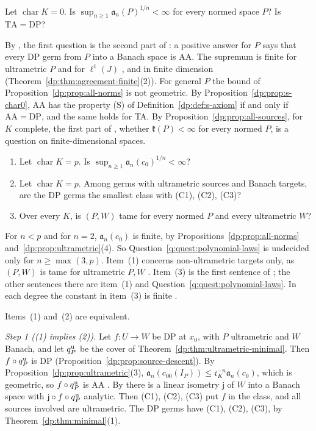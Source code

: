\begin{question}\label{dp:q:char0}
Let $\operatorname{char}K=0$. Is $\sup_{n\ge1}\mathfrak a_n(P)^{1/n}<\infty$ for every normed space $P$? Is $\mathrm{TA}=\mathrm{DP}$?
\end{question}

By \cite[Proposition~14.37]{I}, the first question is the second part of \cite[Question~14.42(1)]{I}: a positive answer for $P$ says that every DP germ from $P$ into a Banach space is AA. The supremum is finite for ultrametric $P$ and for $\ell^1(J)$ \cite[Theorem~14.39(2),(3)]{I}, and in finite dimension (Theorem~\ref{dp:thm:agreement-finite}(2)). For general $P$ the bound of Proposition~\ref{dp:prop:all-norms} is not geometric. By Proposition~\ref{dp:prop:s-char0}, AA has the property (S) of Definition~\ref{dp:def:s-axiom} if and only if $\mathrm{AA}=\mathrm{DP}$, and the same holds for TA. By Proposition~\ref{dp:prop:all-sources}, for $K$ complete, the first part of \cite[Question~14.42(1)]{I}, whether $\mathfrak k(P)<\infty$ for every normed $P$, is a question on finite-dimensional spaces.

\begin{question}\label{dp:q:c0}
\leavevmode
\begin{enumerate}
\item Let $\operatorname{char}K=p$. Is $\sup_{n\ge1}\mathfrak a_n(c_0)^{1/n}<\infty$?
\item Let $\operatorname{char}K=p$. Among germs with ultrametric sources and Banach targets, are the DP germs the smallest class with \textup{(C1), (C2), (C3)}?
\item Over every $K$, is $(P,W)$ tame for every normed $P$ and every ultrametric $W$?
\end{enumerate}
\end{question}

For $n<p$ and for $n=2$, $\mathfrak a_n(c_0)$ is finite, by Propositions~\ref{dp:prop:all-norms} and~\ref{dp:prop:ultrametric}(4). So Question~\ref{q:quest:polynomial-laws} is undecided only for $n\ge\max(3,p)$. Item~(1) concerns non-ultrametric targets only, as $(P,W)$ is tame for ultrametric $P,W$ \cite[Theorem~14.39(1)]{I}. Item~(3) is the first sentence of \cite[Question~14.42(4)]{I}; the other sentences there are item~(1) and Question~\ref{q:quest:polynomial-laws}. In each degree the constant in item~(3) is finite \cite[Theorem~14.39(4)]{I}.

Items~(1) and~(2) are equivalent.

\emph{Step 1 ((1) implies (2)).} Let $f\colon U\to W$ be DP at $x_0$, with $P$ ultrametric and $W$ Banach, and let $q^{\rm u}_P$ be the cover of Theorem~\ref{dp:thm:ultrametric-minimal}. Then $f\circ q^{\rm u}_P$ is DP (Proposition~\ref{dp:prop:source-descent}). By Proposition~\ref{dp:prop:ultrametric}(3), $\mathfrak a_n(c_{00}(I_P))\le\mathfrak c_K^{-n}\mathfrak a_n(c_0)$, which is geometric, so $f\circ q^{\rm u}_P$ is AA \cite[Theorem~14.38(1)]{I}. By \cite[Theorem~14.11]{I} there is a linear isometry $\mathsf j$ of $W$ into a Banach space with $\mathsf j\circ f\circ q^{\rm u}_P$ analytic. Then (C1), (C2), (C3) put $f$ in the class, and all sources involved are ultrametric. The DP germs have (C1), (C2), (C3), by Theorem~\ref{dp:thm:minimal}(1).

